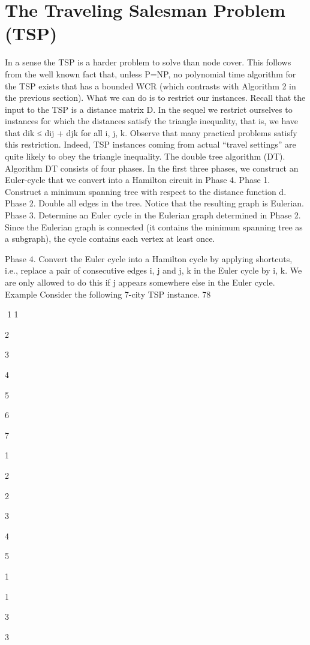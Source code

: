 \section{The Traveling Salesman Problem (TSP)}

In a sense the TSP is a harder problem to solve than node cover. This follows from the well known fact
that, unless P=NP, no polynomial time algorithm for the TSP exists that has a bounded WCR (which
contrasts with Algorithm 2 in the previous section).
What we can do is to restrict our instances. Recall that the input to the TSP is a distance matrix D. In
the sequel we restrict ourselves to instances for which the distances satisfy the triangle inequality, that is,
we have that dik ≤ dij + djk for all i, j, k. Observe that many practical problems satisfy this restriction.
Indeed, TSP instances coming from actual “travel settings” are quite likely to obey the triangle inequality.
The double tree algorithm (DT).
Algorithm DT consists of four phases. In the first three phases, we construct an Euler-cycle that we
convert into a Hamilton circuit in Phase 4.
Phase 1. Construct a minimum spanning tree with respect to the distance function d.
Phase 2. Double all edges in the tree. Notice that the resulting graph is Eulerian.
Phase 3. Determine an Euler cycle in the Eulerian graph determined in Phase 2. Since the Eulerian
graph is connected (it contains the minimum spanning tree as a subgraph), the cycle contains each vertex
at least once.

Phase 4. Convert the Euler cycle into a Hamilton cycle by applying shortcuts, i.e., replace a pair of
consecutive edges {i, j} and {j, k} in the Euler cycle by {i, k}. We are only allowed to do this if j appears
somewhere else in the Euler cycle.
Example Consider the following 7-city TSP instance.
78

1
1

2

3

4

5

6

7

1

2

2

3

4

5

1

1

3

3

